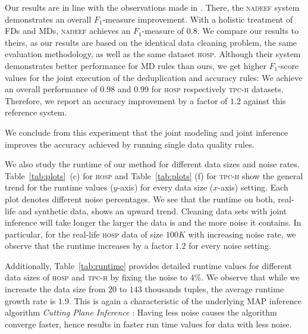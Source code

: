 Our results are in line with the observations made in \cite{Dallachiesa:2013:NCD:2463676.2465327}. There, the \textsc{nadeef} system demonstrates an overall $F_1$-measure improvement. With a holistic treatment of FDs and MDs, \textsc{nadeef} achieves an $F_1$-measure of $0.8$. We compare our results to theirs, as our results are based on the identical data cleaning problem, the same evaluation methodology, as well as the same dataset \textsc{hosp}. Although their system demonstrates better performance for MD rules than ours, we get higher $F_1$-score values for the joint execution of the deduplication and accuracy rules: We achieve an overall performance of $0.98$ and $0.99$ for \textsc{hosp} respectively \textsc{tpc-h} datasets. Therefore, we report an accuracy improvement by a factor of $1.2$ against this reference system.

We conclude from this experiment that the joint modeling and joint inference improves the accuracy achieved by running single data quality rules.

We also study the runtime of our method for different data sizes and noise rates. Table~\ref{tab:plots}~(c) for \textsc{hosp} and Table~\ref{tab:plots} (f) for \textsc{tpc-h} show the general trend for the runtime values ($y$-axis) for every data size ($x$-axis) setting. Each plot denotes different noise percentages. We see that the runtime on both, real-life and synthetic data, shows an upward trend. Cleaning data sets with joint inference will take longer the larger the data is and the more noise it contains. In particular, for the real-life \textsc{hosp} data of size $100K$ with increasing noise rate, we observe that the runtime increases by a factor $1.2$ for every noise setting. 

Additionally, Table~\ref{tab:runtime} provides detailed runtime values for different data sizes of \textsc{hosp} and \textsc{tpc-h} by fixing the noise to $4\%$. We observe that while we increaste the data size from $20$ to $143$ thousands tuples, the average runtime growth rate is $1.9$. This is again a characteristic of the underlying MAP inference algorithm \textit{Cutting Plane Inference} \cite{riedel08improving}: Having less noise causes the algorithm converge faster, hence results in faster run time values for data with less noise. 

